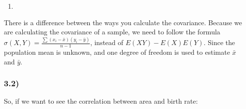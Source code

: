 \documentclass[
]{article}
\newenvironment{Shaded}{\begin{snugshade}}{\end{snugshade}}
\newcommand{\AttributeTok}[1]{\textcolor[rgb]{0.77,0.63,0.00}{#1}}
\newcommand{\DecValTok}[1]{\textcolor[rgb]{0.00,0.00,0.81}{#1}}
\newcommand{\FunctionTok}[1]{\textcolor[rgb]{0.00,0.00,0.00}{#1}}
\newcommand{\NormalTok}[1]{#1}
\newcommand{\OtherTok}[1]{\textcolor[rgb]{0.56,0.35,0.01}{#1}}
\newcommand{\SpecialCharTok}[1]{\textcolor[rgb]{0.00,0.00,0.00}{#1}}
\providecommand{\tightlist}{%
  \setlength{\itemsep}{0pt}\setlength{\parskip}{0pt}}
\begin{document}
\begin{enumerate}
\def\labelenumi{\alph{enumi})}
\setcounter{enumi}{21}
\tightlist
\item
\end{enumerate}

There is a difference between the ways you calculate the covariance.
Because we are calculating the covariance of a sample, we need to follow
the formula
\(\sigma(X,Y) = \frac{\sum(x_i - \bar x)(y_i - \bar y)}{n-1}\), instead
of \(E(XY) - E(X) E(Y)\). Since the population mean is unknown, and one
degree of freedom is used to estimate \(\bar x\) and \(\bar y\).

\hypertarget{section-10}{%
\subsubsection{3.2)}\label{section-10}}

So, if we want to see the correlation between area and birth rate:

\begin{Shaded}
\end{Shaded}
\end{document}
